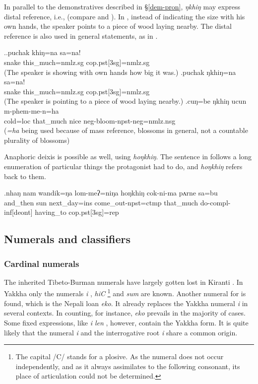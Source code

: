 In parallel to the demonstratives described in §\ref{dem-pron}, \emph{ŋkhiŋ} may express distal reference, i.e.,  (compare \Next[a] and \Next[b]). In \Next[b], instead of indicating the size with his own hands, the speaker points to a piece of wood laying nearby. The distal reference is also used in general statements, as in \Next[c].

\ex.\ag.puchak khiŋ=na sa=na!\\
snake this\_much{\sc =nmlz.sg} {\sc cop.pst[3sg]=nmlz.sg}\\
 (The speaker is showing with own hands how big it was.)
\bg.puchak ŋkhiŋ=na sa=na!\\
snake this\_much{\sc =nmlz.sg} {\sc cop.pst[3sg]=nmlz.sg}\\
 (The speaker is pointing to a piece of wood laying nearby.)
\bg.cuŋ=be ŋkhiŋ ucun m-phem-me-n=ha\\
cold{\sc =loc} that\_much nice {\sc neg-}bloom{\sc [3sg]-npst-neg=nmlz.nsg}\\
 (\emph{=ha} being used because of mass reference, blossoms in general, not a countable plurality of blossoms) 

 
Anaphoric deixis is possible as well, using \emph{hoŋkhiŋ}. The sentence in \Next follows a long enumeration of particular things the protagonist had to do, and \emph{hoŋkhiŋ} refers back to them.

\exg.nhaŋ    nam wandik=ŋa lom-meʔ=niŋa        hoŋkhiŋ cok-ni-ma           pʌrne    sa=bu\\
and\_then sun next\_day{\sc =ins} come\_out{\sc [3sg]-npst=ctmp} that\_much do{\sc -compl-inf[deont]} having\_to {\sc cop.pst[3sg]=rep}\\
  

\subsection{Numerals and classifiers}\label{sec-num}

\subsubsection{Cardinal numerals}

The inherited Tibeto-Burman numerals have largely gotten lost in Kiranti \citep{Ebert1994The-structure}. In Yakkha only the numerals \emph{i} , \emph{hiC} \footnote{The capital /C/ stands for a plosive. As the numeral does not occur independently, and as it always assimilates to the following consonant, its place of articulation could not be determined.} and \emph{sum}  are known. Another  numeral for  is found, which is the Nepali loan \emph{eko}. It already replaces the Yakkha numeral \emph{i} in several contexts. In counting, for instance,  \emph{eko} prevails in the majority of cases. Some fixed expressions, like \emph{i len} , however, contain the Yakkha form. It is quite likely  that the numeral \emph{i} and the interrogative root \emph{i} share a common origin.

